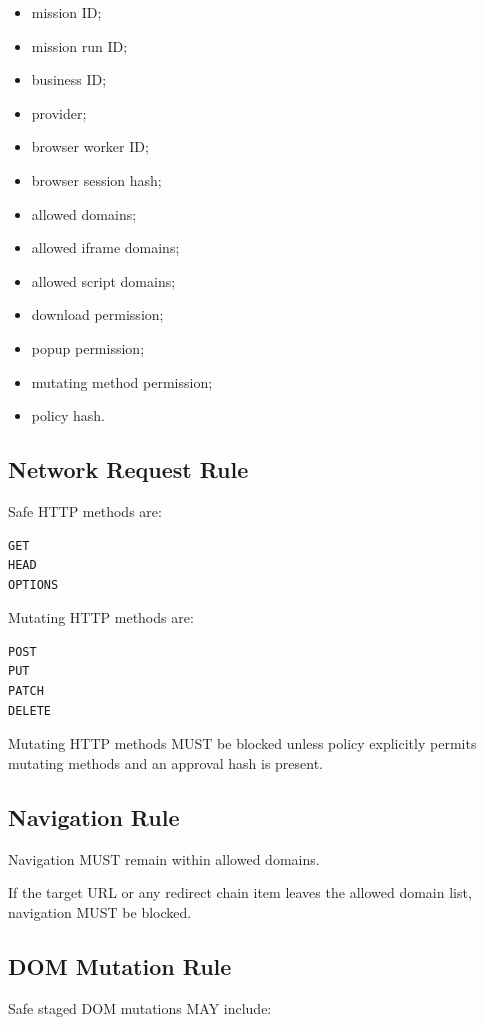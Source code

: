 \begin{itemize}
  \item mission ID;
  \item mission run ID;
  \item business ID;
  \item provider;
  \item browser worker ID;
  \item browser session hash;
  \item allowed domains;
  \item allowed iframe domains;
  \item allowed script domains;
  \item download permission;
  \item popup permission;
  \item mutating method permission;
  \item policy hash.
\end{itemize}

\subsection{Network Request Rule}

Safe HTTP methods are:

\begin{verbatim}
GET
HEAD
OPTIONS
\end{verbatim}

Mutating HTTP methods are:

\begin{verbatim}
POST
PUT
PATCH
DELETE
\end{verbatim}

Mutating HTTP methods MUST be blocked unless policy explicitly permits mutating methods and an approval hash is present.

\subsection{Navigation Rule}

Navigation MUST remain within allowed domains.

If the target URL or any redirect chain item leaves the allowed domain list, navigation MUST be blocked.

\subsection{DOM Mutation Rule}

Safe staged DOM mutations MAY include:

